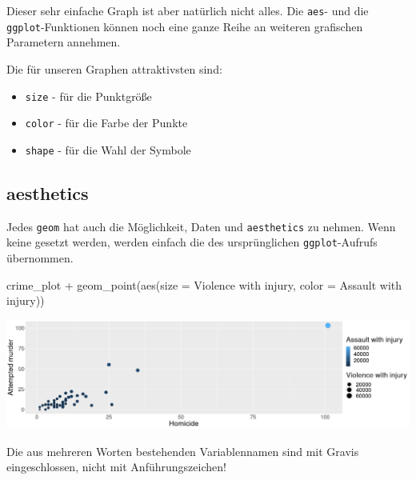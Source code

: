 \documentclass[
]{book}
\newenvironment{Shaded}{\begin{snugshade}}{\end{snugshade}}
\newcommand{\AttributeTok}[1]{\textcolor[rgb]{0.77,0.63,0.00}{#1}}
\newcommand{\FunctionTok}[1]{\textcolor[rgb]{0.00,0.00,0.00}{#1}}
\newcommand{\NormalTok}[1]{#1}
\newcommand{\SpecialCharTok}[1]{\textcolor[rgb]{0.00,0.00,0.00}{#1}}
\newcommand{\StringTok}[1]{\textcolor[rgb]{0.31,0.60,0.02}{#1}}
\providecommand{\tightlist}{%
  \setlength{\itemsep}{0pt}\setlength{\parskip}{0pt}}
\begin{document}
Dieser sehr einfache Graph ist aber natürlich nicht alles. Die \texttt{aes}- und die \texttt{ggplot}-Funktionen können noch eine ganze Reihe an weiteren grafischen Parametern annehmen.

Die für unseren Graphen attraktivsten sind:

\begin{itemize}
\tightlist
\item
  \texttt{size} - für die Punktgröße
\item
  \texttt{color} - für die Farbe der Punkte
\item
  \texttt{shape} - für die Wahl der Symbole
\end{itemize}

\hypertarget{aesthetics-2}{%
\subsection{aesthetics}\label{aesthetics-2}}

Jedes \texttt{geom} hat auch die Möglichkeit, Daten und \texttt{aesthetics} zu nehmen. Wenn keine gesetzt werden, werden einfach die des ursprünglichen \texttt{ggplot}-Aufrufs übernommen.

\begin{Shaded}
\begin{Highlighting}[]
\NormalTok{crime\_plot }\SpecialCharTok{+} \FunctionTok{geom\_point}\NormalTok{(}\FunctionTok{aes}\NormalTok{(}\AttributeTok{size =} \StringTok{\textasciigrave{}}\AttributeTok{Violence with injury}\StringTok{\textasciigrave{}}\NormalTok{, }
                            \AttributeTok{color =} \StringTok{\textasciigrave{}}\AttributeTok{Assault with injury}\StringTok{\textasciigrave{}}\NormalTok{))}
\end{Highlighting}
\end{Shaded}

\begin{center}\includegraphics[width=24in]{imgs/pts2} \end{center}

Die aus mehreren Worten bestehenden Variablennamen sind mit Gravis eingeschlossen, nicht mit Anführungszeichen!
\end{document}
